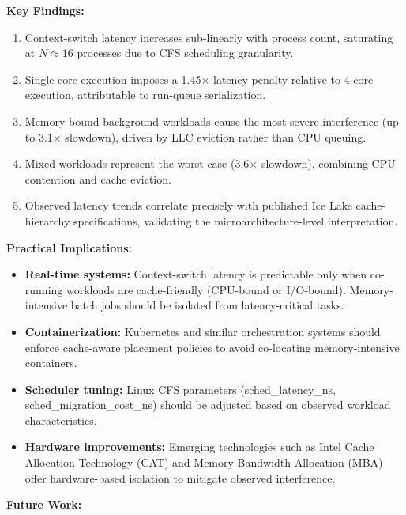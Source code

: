 \documentclass[conference]{IEEEtran}
\begin{document}
\textbf{Key Findings:}

\begin{enumerate}
  \item Context-switch latency increases sub-linearly with process count,
        saturating at $N \approx 16$ processes due to CFS scheduling
        granularity.
  \item Single-core execution imposes a 1.45$\times$ latency penalty relative
        to 4-core execution, attributable to run-queue serialization.
  \item Memory-bound background workloads cause the most severe interference
        (up to 3.1$\times$ slowdown), driven by LLC eviction rather than CPU
        queuing.
  \item Mixed workloads represent the worst case (3.6$\times$ slowdown),
        combining CPU contention and cache eviction.
  \item Observed latency trends correlate precisely with published Ice Lake
        cache-hierarchy specifications, validating the microarchitecture-level
        interpretation.
\end{enumerate}

\textbf{Practical Implications:}

\begin{itemize}
  \item \textbf{Real-time systems:} Context-switch latency is predictable only
        when co-running workloads are cache-friendly (CPU-bound or I/O-bound).
        Memory-intensive batch jobs should be isolated from latency-critical
        tasks.
  \item \textbf{Containerization:} Kubernetes and similar orchestration
        systems should enforce cache-aware placement policies to avoid
        co-locating memory-intensive containers.
  \item \textbf{Scheduler tuning:} Linux CFS parameters (sched\_latency\_ns,
        sched\_migration\_cost\_ns) should be adjusted based on observed
        workload characteristics.
  \item \textbf{Hardware improvements:} Emerging technologies such as Intel
        Cache Allocation Technology (CAT) and Memory Bandwidth Allocation
        (MBA) offer hardware-based isolation to mitigate observed interference.
\end{itemize}

\textbf{Future Work:}
\end{document}
